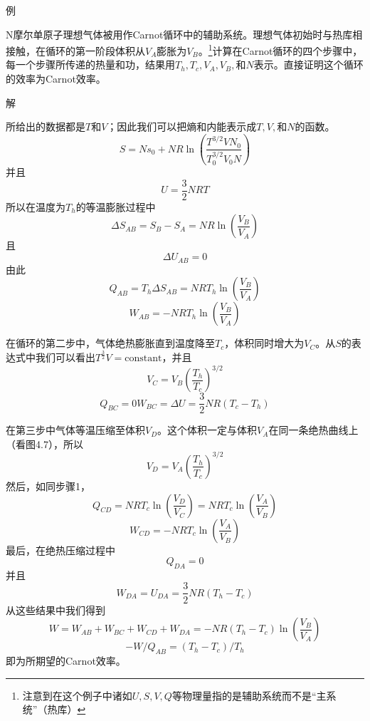 例

N摩尔单原子理想气体被用作Carnot循环中的辅助系统。理想气体初始时与热库相接触，在循环的第一阶段体积从$V_A$膨胀为$V_B$。\footnote{注意到在这个例子中诸如$U,S,V,Q$等物理量指的是辅助系统而不是“主系统”（热库）}计算在Carnot循环的四个步骤中，每一个步骤所传递的热量和功，结果用$T_h,T_c,V_A,V_B,$和$N$表示。直接证明这个循环的效率为Carnot效率。

解

\noindent 所给出的数据都是$T$和$V$；因此我们可以把熵和内能表示成$T,V,$和$N$的函数。
\[S = Ns_0 + NR\ln(\frac{T^{3/2}VN_0}{T_0^{3/2}V_0N})\]
并且
\[U = \frac{3}{2}NRT\]
所以在温度为$T_h$的等温膨胀过程中
\[\Delta S_{AB} = S_B - S_A = NR\ln(\frac{V_B}{V_A})\]
且
\[\Delta U_{AB} = 0\]
由此
\[Q_{AB} = T_h\Delta S_{AB} = NRT_h\ln(\frac{V_B}{V_A})\]
\[W_{AB} = -NRT_h\ln(\frac{V_B}{V_A})\]

在循环的第二步中，气体绝热膨胀直到温度降至$T_c$，体积同时增大为$V_C$。从$S$的表达式中我们可以看出$T^{\frac{3}{2}}V = \text{constant}$，并且
\[V_C = V_B(\frac{T_h}{T_c})^{3/2}\]
\[Q_{BC}=0  W_{BC}=\Delta U = \frac{3}{2}NR(T_c - T_h)\]

在第三步中气体等温压缩至体积$V_D$。这个体积一定与体积$V_A$在同一条绝热曲线上（看图4.7），所以
\[V_D = V_A(\frac{T_h}{T_c})^{3/2}\]
然后，如同步骤1，
\[Q_{CD} = NRT_c\ln(\frac{V_D}{V_C}) = NRT_c\ln(\frac{V_A}{V_B})\]
\[W_{CD} = -NRT_c\ln(\frac{V_A}{V_B})\]
最后，在绝热压缩过程中
\[Q_{DA} = 0\]
并且
\[W_{DA} = U_{DA} = \frac{3}{2}NR(T_h - T_c)\]
从这些结果中我们得到
\[W = W_{AB} + W_{BC} + W_{CD} + W_{DA} = -NR(T_h - T_c)\ln(\frac{V_B}{V_A})\]
\[-W/Q_{AB} = (T_h - T_c)/T_h\]
即为所期望的Carnot效率。

